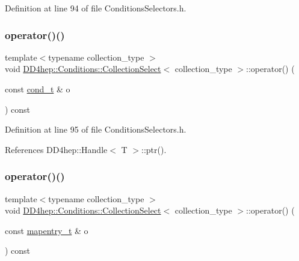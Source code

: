 Definition at line 94 of file Conditions\+Selectors.\+h.

\hypertarget{class_d_d4hep_1_1_conditions_1_1_collection_select_a23f47d76995dead2d8998a98978d1168}{}\label{class_d_d4hep_1_1_conditions_1_1_collection_select_a23f47d76995dead2d8998a98978d1168} 
\subsubsection{\texorpdfstring{operator()()}{operator()()}\hspace{0.1cm}{\footnotesize\ttfamily [2/4]}}
{\footnotesize\ttfamily template$<$typename collection\+\_\+type $>$ \\
void \hyperlink{class_d_d4hep_1_1_conditions_1_1_collection_select}{D\+D4hep\+::\+Conditions\+::\+Collection\+Select}$<$ collection\+\_\+type $>$\+::operator() (\begin{DoxyParamCaption}\item[{const \hyperlink{class_d_d4hep_1_1_conditions_1_1_cond_____oper_aceca9f6a0e8c84364946eace47275d09}{cond\+\_\+t} \&}]{o }\end{DoxyParamCaption}) const\hspace{0.3cm}{\ttfamily [inline]}}



Definition at line 95 of file Conditions\+Selectors.\+h.



References D\+D4hep\+::\+Handle$<$ T $>$\+::ptr().

\hypertarget{class_d_d4hep_1_1_conditions_1_1_collection_select_aa4e171a7d3f3d28bdbe47ff4dcfac3f6}{}\label{class_d_d4hep_1_1_conditions_1_1_collection_select_aa4e171a7d3f3d28bdbe47ff4dcfac3f6} 
\subsubsection{\texorpdfstring{operator()()}{operator()()}\hspace{0.1cm}{\footnotesize\ttfamily [3/4]}}
{\footnotesize\ttfamily template$<$typename collection\+\_\+type $>$ \\
void \hyperlink{class_d_d4hep_1_1_conditions_1_1_collection_select}{D\+D4hep\+::\+Conditions\+::\+Collection\+Select}$<$ collection\+\_\+type $>$\+::operator() (\begin{DoxyParamCaption}\item[{const \hyperlink{class_d_d4hep_1_1_conditions_1_1_cond_____oper_a877dac3da66795207aed15be219acbdc}{mapentry\+\_\+t} \&}]{o }\end{DoxyParamCaption}) const\hspace{0.3cm}{\ttfamily [inline]}}



